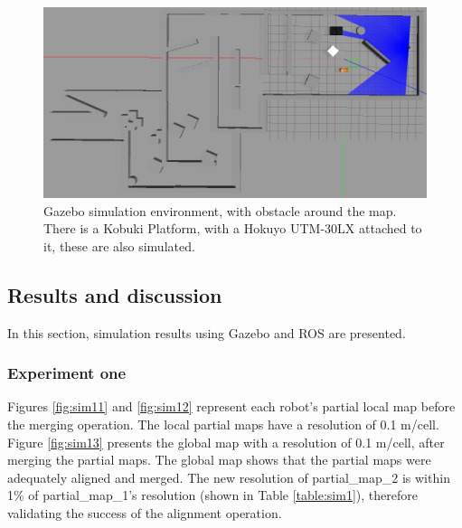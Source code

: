 \begin{figure}[H]
    \centering
    \includegraphics[width=1\textwidth]{figs/maze_area.png}
    \caption{Gazebo simulation environment, with obstacle around the map. There is a Kobuki Platform, with a Hokuyo UTM-30LX attached to it, these are also simulated. }
    \label{fig:maze_arena}
\end{figure}

\subsection{Results and discussion}
\label{sec:sim_results}
In this section, simulation results using Gazebo and ROS are presented. 

\subsubsection{Experiment one} %

Figures \ref{fig:sim11} and \ref{fig:sim12} represent each robot's partial local map before the merging operation. The local partial maps have a resolution of 0.1 m/cell. Figure \ref{fig:sim13} presents the global map with a resolution of 0.1 m/cell, after merging the partial maps. The global map shows that the partial maps were adequately aligned and merged. The new resolution of partial\_map\_2 is within 1\% of partial\_map\_1's resolution (shown in Table \ref{table:sim1}), therefore validating the success of the alignment operation.  

